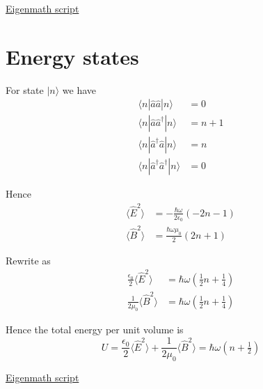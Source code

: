 \href{https://georgeweigt.github.io/examples/coherent-state-demo.html}{Eigenmath script}












\section*{Energy states}
For state $|n\rangle$ we have
\begin{align*}
\langle n|\hat a\hat a|n\rangle&=0
\\
\langle n|\hat a\hat a^\dag|n\rangle&=n+1
\\
\langle n|\hat a^\dag\hat a|n\rangle&=n
\\
\langle n|\hat a^\dag\hat a^\dag|n\rangle&=0
\end{align*}

Hence
\begin{align*}
\langle\hat E^2\rangle
&=-\frac{\hbar\omega}{2\epsilon_0}(-2n-1)
\\
\langle\hat B^2\rangle
&=\frac{\hbar\omega\mu_0}{2}(2n+1)
\end{align*}

Rewrite as
\begin{align*}
\frac{\epsilon_0}{2}\langle\hat E^2\rangle&=\hbar\omega\left(\tfrac{1}{2}n+\tfrac{1}{4}\right)
\\
\frac{1}{2\mu_0}\langle\hat B^2\rangle&=\hbar\omega\left(\tfrac{1}{2}n+\tfrac{1}{4}\right)
\end{align*}

Hence the total energy per unit volume is
\begin{equation*}
U=\frac{\epsilon_0}{2}\langle\hat E^2\rangle
+\frac{1}{2\mu_0}\langle\hat B^2\rangle
=\hbar\omega\left(n+\tfrac{1}{2}\right)
\end{equation*}

\href{https://georgeweigt.github.io/examples/coherent-state-demo.html}{Eigenmath script}


